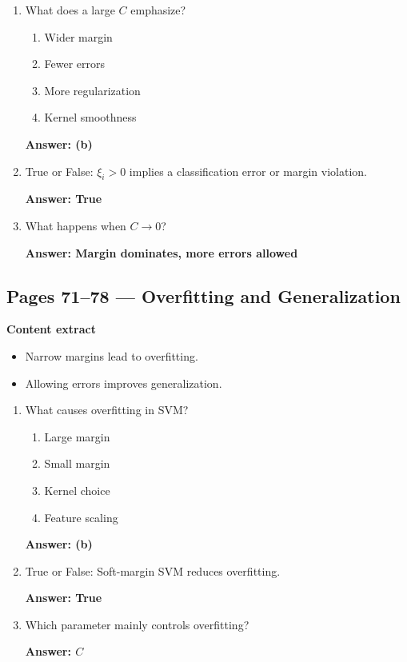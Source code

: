 \documentclass[12pt]{article}
\begin{document}
\begin{enumerate}
	\item What does a large $C$ emphasize?
	\begin{enumerate}
		\item Wider margin
		\item Fewer errors
		\item More regularization
		\item Kernel smoothness
	\end{enumerate}
	\textbf{Answer: (b)}
	
	\item True or False: $\xi_i>0$ implies a classification error or margin violation.
	
	\textbf{Answer: True}
	
	\item What happens when $C \to 0$?
	
	\textbf{Answer: Margin dominates, more errors allowed}
\end{enumerate}

\subsection*{Pages 71--78 — Overfitting and Generalization}

\textbf{Content extract}
\begin{itemize}
	\item Narrow margins lead to overfitting.
	\item Allowing errors improves generalization.
\end{itemize}

\begin{enumerate}
	\item What causes overfitting in SVM?
	\begin{enumerate}
		\item Large margin
		\item Small margin
		\item Kernel choice
		\item Feature scaling
	\end{enumerate}
	\textbf{Answer: (b)}
	
	\item True or False: Soft-margin SVM reduces overfitting.
	
	\textbf{Answer: True}
	
	\item Which parameter mainly controls overfitting?
	
	\textbf{Answer: $C$}
\end{enumerate}
\end{document}
